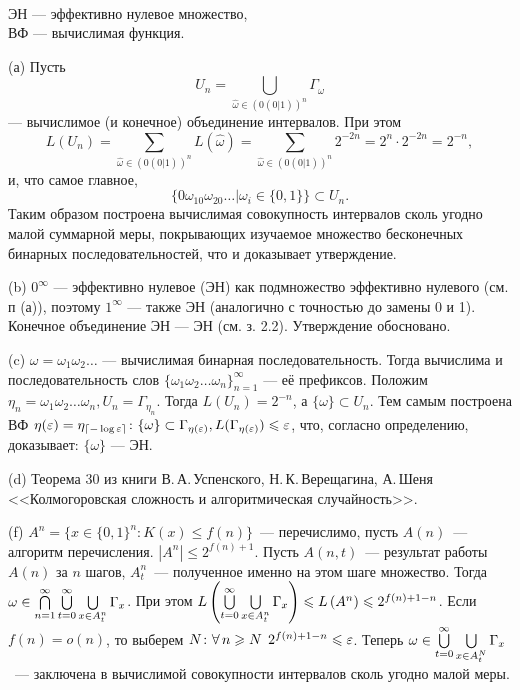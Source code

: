 
{\bfseries {}}\\
ЭН --- эффективно нулевое множество,\\
ВФ --- вычислимая функция.


(а) Пусть $$U_n=\bigcup\limits_{\hat\omega\in\left(0(0|1)\right)^n}\Gamma_{\hat\omega}$$ --- вычислимое (и конечное) объединение интервалов. При этом $$L(U_n)=\sum\limits_{\hat\omega\in\left(0(0|1)\right)^n}L(\hat\omega) = \sum\limits_{\hat\omega\in\left(0(0|1)\right)^n} 2^{-2n} = 2^n\cdot 2^{-2n} = 2^{-n},$$ и, что самое главное, $$\{0\omega_10\omega_20\ldots|\omega_i\in\{0,1\}\}\subset U_n.$$ Таким образом построена вычислимая совокупность интервалов сколь угодно малой суммарной меры, покрывающих изучаемое множество бесконечных бинарных последовательностей, что и доказывает утверждение.

(b) $0^\infty$ --- эффективно нулевое (ЭН) как подмножество эффективно нулевого (см. п (а)), поэтому $1^\infty$ --- также ЭН (аналогично с точностью до замены 0 и 1). Конечное объединение ЭН --- ЭН (см. з. 2.2). Утверждение обосновано.

(c) %
$\omega = \omega_1\omega_2\ldots$ --- вычислимая бинарная последовательность. Тогда вычислима и последовательность слов $\{\omega_1\omega_2\ldots\omega_n\}_{n=1}^\infty$ --- её префиксов. Положим  $\eta_n = \omega_1\omega_2\ldots\omega_n, U_n = \Gamma_{\eta_n}.$ Тогда $L(U_n) = 2^{-n}$, а  $\{\omega\}\subset U_n$. Тем самым построена ВФ $\eta(\varepsilon)=\eta_{\lceil-\log \varepsilon \rceil} \colon \{\omega\}\subset\Gamma_{\eta(\varepsilon)}, L(\Gamma_{\eta(\varepsilon)})\leqslant \varepsilon$, что, согласно определению, доказывает: $\{\omega\}$ --- ЭН.

(d) Теорема 30 из книги В.\,А.\,Успенского, Н.\,К.\,Верещагина, А.\,Шеня <<Колмогоровская сложность и алгоритмическая случайность>>.

(f) $A^n = \{x\in\{0,1\}^n\colon K(x)\le f(n)\}$~--- перечислимо, пусть $A(n)$~--- алгоритм перечисления. $|A^n|\le 2^{f(n) + 1}.$ Пусть $A(n,t)$~--- результат работы $A(n)$ за $n$ шагов, $A^n_t$~--- полученное именно на этом шаге множество.
Тогда $\omega\in\bigcap\limits_{n=1}^{\infty}\bigcup\limits_{t=0}^{\infty}\bigcup\limits_{x\in A^n_t}^{}\Gamma_x$. При этом $L\left(\bigcup\limits_{t=0}^{\infty}\bigcup\limits_{x\in A^n_t}^{}\Gamma_x\right) \leqslant L\left(A^n\right) \leqslant 2^{f(n)+1-n}$. Если $f(n)=o(n)$, то выберем $N\colon\forall\,n\geqslant N\:\: 2^{f(n)+1-n} \leqslant \varepsilon$. Теперь $\omega\in\bigcup\limits_{t=0}^{\infty}\bigcup\limits_{x\in A^N_t}^{}\Gamma_x$~--- заключена в вычислимой совокупности интервалов сколь угодно малой меры.

